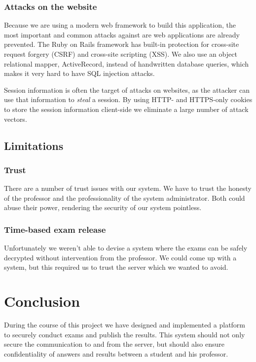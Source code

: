 \documentclass[12pt]{article}
\begin{document}
\subsubsection{Attacks on the website}

Because we are using a modern web framework to build this application, the most
important and common attacks against are web applications are already prevented.
The Ruby on Rails framework has built-in protection for cross-site request
forgery (CSRF) and cross-site scripting (XSS). We also use an object relational
mapper, ActiveRecord, instead of handwritten database queries, which makes it
very hard to have SQL injection attacks.

Session information is often the target of attacks on websites, as the attacker
can use that information to \emph{steal} a session. By using HTTP- and
HTTPS-only cookies to store the session information client-side we eliminate a
large number of attack vectors.

\subsection{Limitations}
\label{subsec:req-limitations}

\subsubsection{Trust}

There are a number of trust issues with our system. We have to trust the honesty
of the professor and the professionality of the system administrator. Both could
abuse their power, rendering the security of our system pointless.

\subsubsection{Time-based exam release}

Unfortunately we weren't able to devise a system where the exams can be
safely decrypted without intervention from the professor. We could come up with
a system, but this required us to trust the server which we wanted to avoid.

\section{Conclusion}
\label{sec:conclusion}

During the course of this project we have designed and implemented a platform
to securely conduct exams and publish the results. This system should not only
secure the communication to and from the server, but should also ensure
confidentiality of answers and results between a student and his professor.
\end{document}
